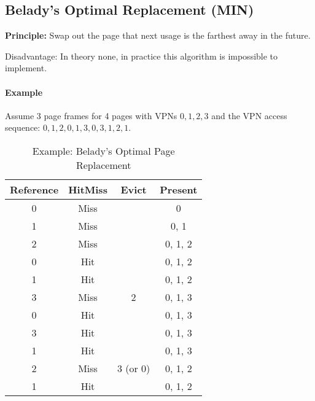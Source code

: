 \documentclass[a4paper, 11pt, accentcolor = tud3b]{tudreport}
\begin{document}
            \subsection{Belady's Optimal Replacement (MIN)}
                \textbf{Principle:} Swap out the page that next usage is the farthest away in the future.
                
                Disadvantage: In theory none, in practice this algorithm is impossible to implement.
                
                \paragraph{Example}
	                Assume 3 page frames for 4 pages with VPNs \( 0, 1, 2, 3 \) and the VPN access sequence: \( 0, 1, 2, 0, 1, 3, 0, 3, 1, 2, 1 \).
	                \begin{table}[H]
	                	\centering
	                	\begin{tabular}{c|c|c|c}
	                		\textbf{Reference} & \textbf{Hit}\textbf{Miss} & \textbf{Evict} & \textbf{Present} \\ \hline
	                		        0          &           Miss            &                &        0         \\
	                		        1          &           Miss            &                &       0, 1       \\
	                		        2          &           Miss            &                &     0, 1, 2      \\
	                		        0          &            Hit            &                &     0, 1, 2      \\
	                		        1          &            Hit            &                &     0, 1, 2      \\
	                		        3          &           Miss            &       2        &     0, 1, 3      \\
	                		        0          &            Hit            &                &     0, 1, 3      \\
	                		        3          &            Hit            &                &     0, 1, 3      \\
	                		        1          &            Hit            &                &     0, 1, 3      \\
	                		        2          &           Miss            &    3 (or 0)    &     0, 1, 2      \\
	                		        1          &            Hit            &                &     0, 1, 2
	                	\end{tabular}
	                	\caption{Example: Belady's Optimal Page Replacement}
	                \end{table}
\end{document}

